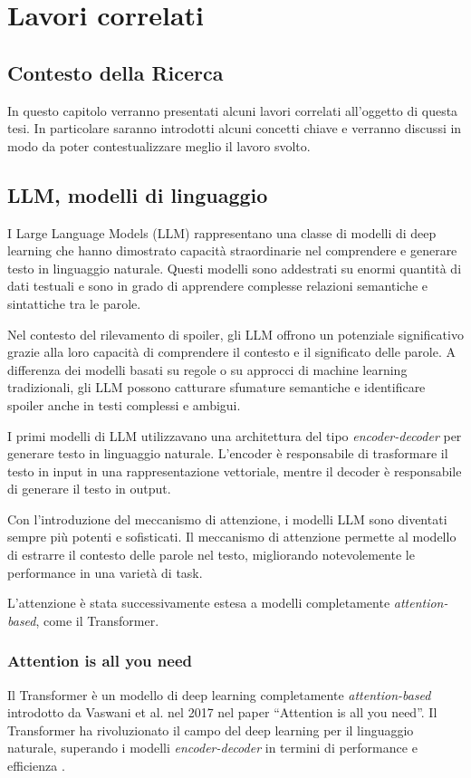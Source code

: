 \chapter{Lavori correlati}
\label{ch:lavori-correlati}

\section{Contesto della Ricerca}
\label{sec:contesto-della-ricerca}
In questo capitolo verranno presentati alcuni lavori
correlati all'oggetto di questa tesi.
In particolare saranno introdotti alcuni concetti chiave e
verranno discussi in modo da poter contestualizzare meglio
il lavoro svolto.

\section{LLM, modelli di linguaggio}
\label{sec:llm-modelli-di-linguaggio}
I Large Language Models (LLM) rappresentano una classe di
modelli di deep learning che hanno dimostrato capacità
straordinarie nel comprendere e generare testo in
linguaggio naturale.
Questi modelli sono addestrati su enormi quantità di dati
testuali e sono in grado di apprendere complesse relazioni
semantiche e sintattiche tra le parole.

Nel contesto del rilevamento di spoiler, gli LLM offrono un
potenziale significativo grazie alla loro capacità di
comprendere il contesto e il significato delle parole.
A differenza dei modelli basati su regole o su approcci di
machine learning tradizionali, gli LLM possono catturare
sfumature semantiche e identificare spoiler anche in testi
complessi e ambigui.

I primi modelli di LLM utilizzavano una architettura del
tipo \textit{encoder-decoder} per generare testo in
linguaggio naturale.
L'encoder è responsabile di trasformare il testo in input
in una rappresentazione vettoriale, mentre il decoder è
responsabile di generare il testo in output.

Con l'introduzione del meccanismo di attenzione, i modelli
LLM sono diventati sempre più potenti e sofisticati.
Il meccanismo di attenzione permette al modello di estrarre
il contesto delle parole nel testo, migliorando
notevolemente le performance in una varietà di task.

L'attenzione è stata successivamente estesa a modelli
completamente \textit{attention-based}, come il
Transformer.

\subsection{Attention is all you need}
\label{sec:attention-is-all-you-need}
Il Transformer è un modello di deep learning completamente
\textit{attention-based} introdotto da Vaswani et al.
nel 2017 nel paper ``Attention is
all you need''\cite{vaswani2017attention}.
Il Transformer ha rivoluzionato il campo del deep learning
per il linguaggio naturale, superando i modelli
\textit{encoder-decoder} in termini di performance e
efficienza \cite{google2017transformer}.

